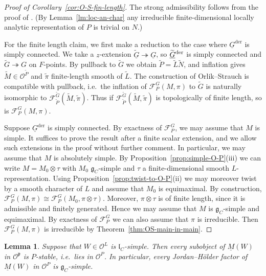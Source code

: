 \documentclass[a4paper]{amsart}
\numberwithin{equation}{section}
\newtheorem{lem}[thm]{Lemma}
\theoremstyle{remark}
\theoremstyle{definition}
\newcommand{\alggrp}[1]{\underline{#1}}
\newcommand{\der}{\mathrm{der}}
\newcommand{\onto}{\twoheadrightarrow}
\newcommand{\lowprime}[1][\prime]{
  \mathchoice
    {\raisebox{-0.7ex}{$\scriptstyle #1$}}
    {\raisebox{-0.7ex}{$\scriptstyle #1$}}
    {\raisebox{-0.7ex}{$\scriptstyle #1$}}
    {\raisebox{-0.3ex}{$\scriptscriptstyle #1$}}
}
\newcommand{\wt}[1]{\widetilde{#1}}
\begin{document}
\begin{proof}[Proof of Corollary~\ref{cor:O-S-fin-length}]
  The strong admissibility follows from the proof of \cite[Lemma 2.4(ii)]{OS2}.
  (By Lemma~\ref{lm:loc-an-char} any irreducible finite-dimensional locally analytic representation of $P$ is trivial on $N$.)
  
  For the finite length claim, we first make a reduction to the case where $\alggrp{G}^{\der}$ is simply connected.
  We take a $z$-extension $\wt {\alggrp G} \onto \alggrp G$, so $\wt {\alggrp G}^{\lowprime[\der]}$ is simply connected and $\wt G \onto G$ on $F$-points.
  By pullback to $\wt G$ we obtain $\wt P = \wt L \wt N$, and inflation gives $\wt M \in \mathcal O^{\wt P}$ and $\wt\pi$ finite-length smooth of $\wt L$.
  The construction of Orlik--Strauch is compatible with pullback, i.e.\ the inflation of $\mathcal F_P^G(M,\pi)$ to $\wt G$ is naturally isomorphic to $\mathcal F_{\wt P}^{\wt G}(\wt M,\wt \pi)$.
  Thus if $\mathcal F_{\wt P}^{\wt G}(\wt M,\wt \pi)$ is topologically of finite length, so is $\mathcal F_P^G(M,\pi)$.

  Suppose $\alggrp{G}^{\der}$ is simply connected.
  By exactness of $\mathcal F_P^G$, we may assume that $M$ is simple.
  It suffices to prove the result after a finite scalar extension, and we allow such extensions in the proof without further comment.
  In particular, we may assume that $M$ is absolutely simple.
  By Proposition~\ref{prop:simple-O-P}(iii) we can write $M = M_0 \otimes \tau$ with $M_0$ $\mathfrak g_C$-simple and $\tau$ a finite-dimensional smooth $L$-representation.
  Using Proposition~\ref{prop:twist-to-O-P}(ii) we may moreover twist by a smooth character of $L$ and assume that $M_0$ is equimaximal.
  By construction, $\mathcal F_P^G(M,\pi) \cong \mathcal F_P^G(M_0,\pi \otimes \tau)$.
  Moreover, $\pi \otimes \tau$ is of finite length, since it is admissible and finitely generated.
  Hence we may assume that $M$ is $\mathfrak g_C$-simple and equimaximal.
  By exactness of $\mathcal F_P^G$ we can also assume that $\pi$ is irreducible.
  Then $\mathcal F_P^G(M,\pi)$ is irreducible by Theorem~\ref{thm:OS-main-in-main}.
\end{proof}

\begin{lem}\label{lem:subobject-verma}
  Suppose that $W \in \mathcal{O}^{L}$ is $\mathfrak{l}_{C}$-simple. Then every subobject of $\underline{M}(W)$ in $\mathcal{O}^{\mathfrak{p}}$ is $P$-stable, i.e.\ lies in $\mathcal{O}^{P}$.
  In particular, every Jordan--H\"older factor of $\underline{M}(W)$ in $\mathcal{O}^{P}$ is $\mathfrak{g}_{C}$-simple.
\end{lem}
\end{document}

